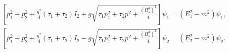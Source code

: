 \begin{equation}
\label{21} 
\begin{array}{c}
\left[ p_1^2+p_2^2+ 
\frac{g^2}4\left( \tau _1+\tau _2\right) I_2+g\sqrt{\tau _1p_1^2+\tau _2p^2+ 
\frac{\left( H_z^3\right) ^2}4}\right] \psi _1=\left( E_1^2-m^2\right) \psi
_1, \\ \left[ p_1^2+p_2^2+\frac{g^2}4\left( \tau _1+\tau _2\right) I_2-g 
\sqrt{\tau _1p_1^2+\tau _2p^2+\frac{\left( H_z^3\right) ^2}4}\right] \psi
_2=\left( E_2^2-m^2\right) \psi _2. 
\end{array}
\end{equation}

